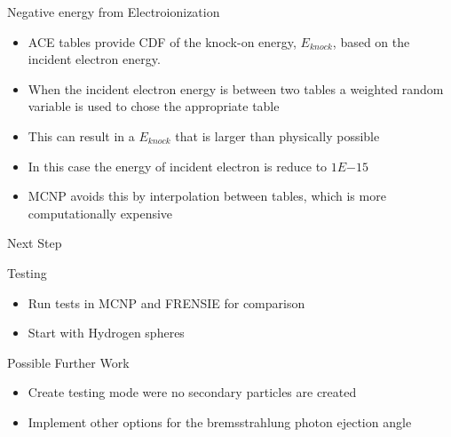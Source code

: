 \documentclass{beamer}
\begin{document}
\begin{frame}{Negative energy from Electroionization}
  
  \begin{itemize}
    \item ACE tables provide CDF of the knock-on energy, $E_{knock}$, based on the incident electron energy.
    \item When the incident electron energy is between two tables a weighted random variable is used to chose the appropriate table
    \item This can result in a $E_{knock}$ that is larger than physically possible
     \item In this case the energy of incident electron is reduce to $1E{-15}$
    \item MCNP avoids this by interpolation between tables, which is more computationally expensive
  \end{itemize}


\end{frame}

\begin{frame}{Next Step}
  
  \begin{block}{Testing}
    \begin{itemize}
      \item Run tests in MCNP and FRENSIE for comparison
      \item Start with Hydrogen spheres
    \end{itemize}
  \end{block}
  
    \begin{block}{Possible Further Work}
    \begin{itemize}
      \item Create testing mode were no secondary particles are created
      \item Implement other options for the bremsstrahlung photon ejection angle
    \end{itemize}
  \end{block}

\end{frame}
\end{document}
